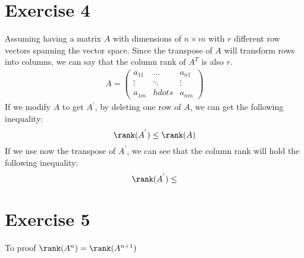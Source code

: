 \section{Exercise 4}
Assuming having a matrix $A$ with dimensions of $n\times m$ with $r$ different row vectors spanning the vector space.
Since the transpose of $A$ will transform rows into columns, we can say that the column rank of $A^T$ is also $r$.
\begin{gather*}
A = \left( \begin{array}{ccc}
a_{11} & \hdots & a_{n1} \\
\vdots & \ddots & \vdots \\
a_{1m} & hdots & a_{nm}
\end{array} \right)
\end{gather*}
If we modify $A$ to get $A^{'}$, by deleting one row of $A$, we can get the following inequality:
\begin{equation*}
\rank(A^{'}) \leq \rank(A)
\end{equation*}
If we use now the transpose of $A^{'}$, we can see that the column rank will hold the following inequality:
\begin{equation*}
\rank (A^{'}) \leq 
\end{equation*} 


\section{Exercise 5}
To proof $\rank (A^n) = \rank (A^{n+1})$ 
